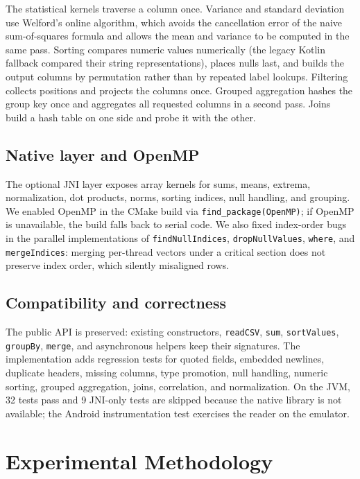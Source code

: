 \documentclass[11pt,a4paper]{article}
\newcommand{\code}[1]{\texttt{#1}}
\begin{document}
The statistical kernels traverse a column once.  Variance and standard deviation use Welford's
online algorithm, which avoids the cancellation error of the naive sum-of-squares formula and
allows the mean and variance to be computed in the same pass.  Sorting compares numeric values
numerically (the legacy Kotlin fallback compared their string representations), places nulls last,
and builds the output columns by permutation rather than by repeated label lookups.  Filtering
collects positions and projects the columns once.  Grouped aggregation hashes the group key once
and aggregates all requested columns in a second pass.  Joins build a hash table on one side and
probe it with the other.

\subsection{Native layer and OpenMP}

The optional JNI layer exposes array kernels for sums, means, extrema, normalization, dot products,
norms, sorting indices, null handling, and grouping.  We enabled OpenMP in the CMake build via
\code{find\_package(OpenMP)}; if OpenMP is unavailable, the build falls back to serial code.  We also
fixed index-order bugs in the parallel implementations of \code{findNullIndices},
\code{dropNullValues}, \code{where}, and \code{mergeIndices}: merging per-thread vectors under a
critical section does not preserve index order, which silently misaligned rows.

\subsection{Compatibility and correctness}

The public API is preserved: existing constructors, \code{readCSV}, \code{sum}, \code{sortValues},
\code{groupBy}, \code{merge}, and asynchronous helpers keep their signatures.  The implementation
adds regression tests for quoted fields, embedded newlines, duplicate headers, missing columns,
type promotion, null handling, numeric sorting, grouped aggregation, joins, correlation, and
normalization.  On the JVM, 32 tests pass and 9 JNI-only tests are skipped because the native
library is not available; the Android instrumentation test exercises the reader on the emulator.

\section{Experimental Methodology}
\end{document}
